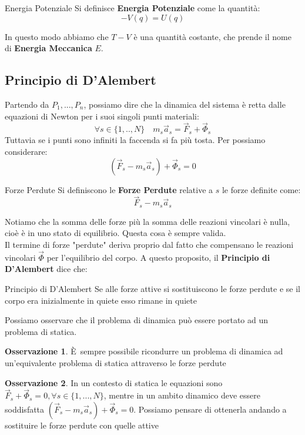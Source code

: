 \documentclass[11pt,a4paper,twoside]{article}
\theoremstyle{definition}
\newtheorem*{oss}{Osservazione}
\begin{document}
\begin{defn}{Energia Potenziale}{}{}
	Si definisce \textbf{Energia Potenziale} come la quantità:
	\[ -V(q)= U(q) \]
\end{defn}
In questo modo abbiamo che $T -V$ è una quantità costante, che prende il nome di \textbf{Energia Meccanica} $E$.

\subsection{Principio di D'Alembert}

Partendo da $P_1,...,P_n$, possiamo dire che la dinamica del sistema è retta dalle equazioni di Newton per i suoi singoli punti materiali:
\[ \forall s \in \{1,..,N\}\quad m_s \vec a_s = \vec F_s + \vec \Phi_s \]
Tuttavia se i punti sono infiniti la faccenda si fa più tosta. Per possiamo considerare:
\[ (\vec F_s - m_s \vec a_s) + \vec \Phi_s = 0 \]

\begin{defn}{Forze Perdute}{}
	Si definiscono le \textbf{Forze Perdute} relative a $s$ le forze definite come:
	\[ \vec F_s - m_s \vec a_s \]
\end{defn}
Notiamo che la somma delle forze più la somma delle reazioni vincolari è nulla, cioè è in uno stato di equilibrio. Questa cosa è sempre valida.\\
Il termine di forze "perdute" deriva proprio dal fatto che compensano le reazioni vincolari $\vec \Phi$ per l'equilibrio del corpo. A questo proposito, il \textbf{Principio di D'Alembert} dice che:

\begin{thm}{Principio di D'Alembert}{}
	Se alle forze attive si sostituiscono le forze perdute e se il corpo era inizialmente in quiete esso rimane in quiete
\end{thm}

Possiamo osservare che il problema di dinamica può essere portato ad un problema di statica.

\begin{oss}
	È sempre possibile ricondurre un problema di dinamica ad un'equivalente problema di statica attraverso le forze perdute
\end{oss}

\begin{oss}
	In un contesto di statica le equazioni sono $\vec F_s + \vec \Phi_s = 0, \forall s \in \{1,...,N\}$, mentre in un ambito dinamico deve essere soddisfatta $(\vec F_s - m_s\vec a_s) + \vec \Phi_s = 0$. Possiamo pensare di ottenerla andando a sostituire le forze perdute con quelle attive
\end{oss}
\end{document}
